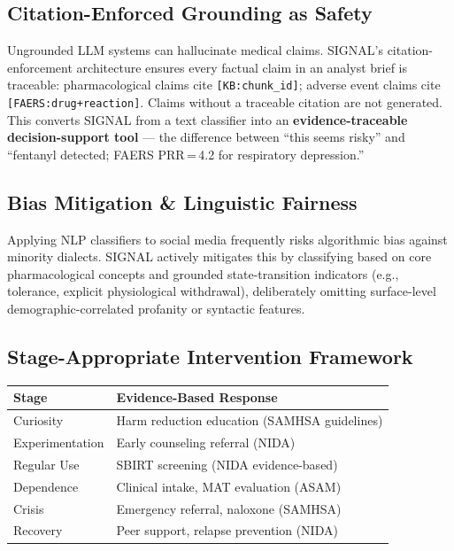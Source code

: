 \documentclass[10pt,twocolumn]{article}
\begin{document}
\subsection{Citation-Enforced Grounding as Safety}
Ungrounded LLM systems can hallucinate medical claims. SIGNAL's
citation-enforcement architecture ensures every factual claim in an analyst
brief is traceable: pharmacological claims cite \texttt{[KB:chunk\_id]};
adverse event claims cite \texttt{[FAERS:drug+reaction]}. Claims without a
traceable citation are not generated. This converts SIGNAL from a text
classifier into an \textbf{evidence-traceable decision-support tool} --- the
difference between ``this seems risky'' and ``fentanyl detected; FAERS
PRR\,=\,4.2 for respiratory depression.''

\subsection{Bias Mitigation \& Linguistic Fairness}
Applying NLP classifiers to social media frequently risks algorithmic bias against minority dialects. SIGNAL actively mitigates this by classifying based on core pharmacological concepts and grounded state-transition indicators (e.g., tolerance, explicit physiological withdrawal), deliberately omitting surface-level demographic-correlated profanity or syntactic features.

\subsection{Stage-Appropriate Intervention Framework}

\begin{center}{\scriptsize\setlength{\tabcolsep}{3pt}
\begin{tabular}{@{}p{1.4cm}p{4.1cm}@{}}
\toprule
\textbf{Stage} & \textbf{Evidence-Based Response}\\
\midrule
Curiosity      & Harm reduction education (SAMHSA guidelines)\\
Experimentation& Early counseling referral (NIDA)\\
Regular Use    & SBIRT screening (NIDA evidence-based)\\
Dependence     & Clinical intake, MAT evaluation (ASAM)\\
Crisis         & Emergency referral, naloxone (SAMHSA)\\
Recovery       & Peer support, relapse prevention (NIDA)\\
\bottomrule
\end{tabular}}\end{center}
\end{document}
